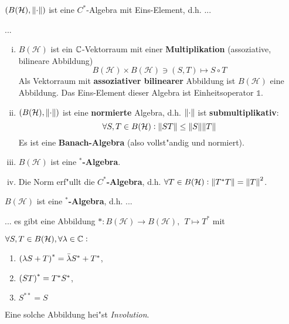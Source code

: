 \documentclass[9pt]{article}
\newcommand{\C}[1]{%
	\ifthenelse{\equal{#1}{}}
	{\mathbb{C}}
	{\mathbb{C}^{#1}}}%
\newcommand{\Hi}{\mathcal{H}}
\newenvironment{field}{}{\newpage}
\newif\ifnote
\newenvironment{note}{\notetrue}{\notefalse}
\newcommand{\localtag}{}
\newcommand{\globaltag}{}
\newcommand{\uuid}{}
\newcommand{\tags}[1]{
    \ifnote 
        \renewcommand{\localtag}{#1}
    \else
        \renewcommand{\globaltag}{#1}
    \fi 
    }
\newcommand{\xplain}[1]{\renewcommand{\uuid}{#1}}
\begin{document}
	\begin{note}
		\xplain{3e608f64-383c-47f7-a110-70cb0066c5e9}
		\tags{6.2.2}
		
		\begin{field}  %
			$(B(\Hi), \norm{\cdot})$ ist eine $C^*$-Algebra mit Eins-Element, d.h. ...
		\end{field}
		
		\begin{field}  %
			...
			\footnotesize
			\begin{enumerate}[i)]
				\item $B(\Hi)$ ist ein $\C{}$-Vektorraum mit einer \textbf{Multiplikation} (assoziative, bilineare Abbildung)
				\begin{equation*}
					B(\Hi) \times B(\Hi) \ni (S,T) \mapsto S \circ T
				\end{equation*}
				Als Vektorraum mit \textbf{assoziativer bilinearer} Abbildung 
				ist $B(\Hi)$ eine Abbildung. Das Eins-Element dieser Algebra ist Einheitsoperator $\mathbb{1}$.
				\item $(B(\Hi), \norm{\cdot})$ ist eine \textbf{normierte} Algebra, d.h. $\norm{\cdot}$ ist \textbf{submultiplikativ}:
				\begin{equation*}
					\forall S,T \in B(\Hi): \norm{ST} \leq \norm{S} \norm{T}
				\end{equation*}
				Es ist eine \textbf{Banach-Algebra} (also vollst"andig und normiert).
				\item $B(\Hi)$ ist eine \textbf{$^*$-Algebra}.
				\item Die Norm erf"ullt die \textbf{${C^*}$-Algebra}, d.h. $\forall T \in B(\Hi): \norm{T^*T} = \norm{T}^2$.
			\end{enumerate}
		\end{field}
			
		\begin{field}  %
			$B(\Hi)$ ist eine \textbf{$^*$-Algebra}, d.h. ...
		\end{field}
		
		\begin{field}  %
			... es gibt eine Abbildung $*: B(\Hi) \rightarrow B(\Hi), \ \ T\mapsto T^*$ mit
			
			$\forall S,T \in B(\Hi), \forall \lambda \in \C{}:$
			\begin{enumerate}
				\item $\qty(\lambda S + T)^* = \bar{\lambda}S^* + T^*$,
				\item $\qty(ST)^* = T^*S^*$,
				\item $S^{**} = S$
			\end{enumerate}
		Eine solche Abbildung hei"st \textit{Involution}.
		\end{field}
	\end{note}
\end{document}

